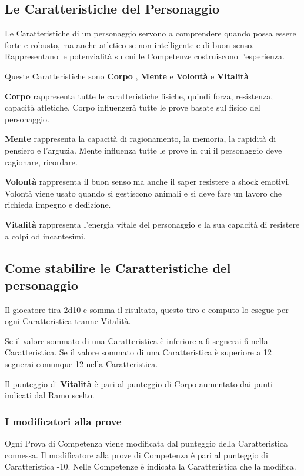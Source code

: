 \documentclass[12pt,a4paper,twoside,openany]{book}
\begin{document}
\begin{multicols}{2}

\subsection{Le Caratteristiche del Personaggio}

Le Caratteristiche di un personaggio servono a comprendere quando possa essere forte e robusto, ma anche atletico se non intelligente e di buon senso. Rappresentano le potenzialità su cui le Competenze costruiscono l'esperienza.

Queste Caratteristiche sono \textbf{Corpo} , \textbf{Mente}  e \textbf{Volontà}  e \textbf{Vitalità}

\textbf{Corpo} rappresenta tutte le caratteristiche fisiche, quindi forza, resistenza, capacità atletiche. Corpo influenzerà tutte le prove basate sul fisico del personaggio.

\textbf{Mente} rappresenta la capacità di ragionamento, la memoria, la rapidità di pensiero e l'arguzia. Mente influenza tutte le prove in cui il personaggio deve ragionare, ricordare.

\textbf{Volontà} rappresenta il buon senso ma anche il saper resistere a shock emotivi. Volontà viene usato quando si gestiscono animali e si deve fare un lavoro che richieda impegno e dedizione.

\textbf{Vitalità} rappresenta l'energia vitale del personaggio e la sua capacità di resistere a colpi od incantesimi.

\subsection{Come stabilire le Caratteristiche del personaggio}

Il giocatore tira 2d10 e somma il risultato, questo tiro e computo lo esegue per ogni Caratteristica tranne Vitalità.

Se il valore sommato di una Caratteristica è inferiore a 6 segnerai 6 nella Caratteristica. Se il valore sommato di una Caratteristica è superiore a 12 segnerai comunque 12 nella Caratteristica.

Il punteggio di \textbf{Vitalità} è pari al punteggio di Corpo aumentato dai punti indicati dal Ramo scelto.

\subsubsection{I modificatori alla prove}

Ogni Prova di Competenza viene modificata dal punteggio della Caratteristica connessa. 
Il modificatore alla prove di Competenza è pari al punteggio di Caratteristica -10. Nelle Competenze è indicata la Caratteristica che la modifica.

\end{multicols}
\end{document}
